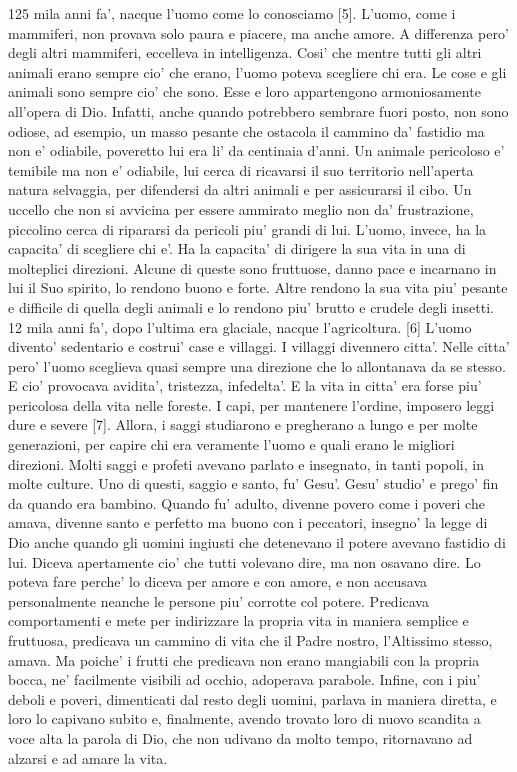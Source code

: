 125 mila anni fa', nacque l'uomo come lo conosciamo [5]. L'uomo, come i mammiferi, non provava solo paura e piacere, ma anche amore. A differenza pero' degli altri mammiferi, eccelleva in intelligenza. Cosi' che mentre tutti gli altri animali erano sempre cio' che erano, l'uomo poteva scegliere chi era. Le cose e gli animali sono sempre cio' che sono. Esse e loro appartengono armoniosamente  all'opera di Dio. Infatti, anche quando potrebbero sembrare fuori posto, non sono odiose, ad esempio, un masso pesante che ostacola il cammino da' fastidio ma non e' odiabile, poveretto lui era li' da centinaia d'anni. Un animale pericoloso e' temibile ma non e' odiabile, lui cerca di ricavarsi il suo territorio nell'aperta natura selvaggia, per difendersi da altri animali e per assicurarsi il cibo. Un uccello che non si avvicina per essere ammirato meglio non da' frustrazione, piccolino cerca di ripararsi da pericoli piu' grandi di lui.
  L'uomo, invece, ha la capacita' di scegliere chi e'. Ha la capacita' di dirigere la sua vita in una di molteplici direzioni. Alcune di queste sono fruttuose, danno pace e incarnano in lui il Suo spirito, lo rendono buono e forte. Altre rendono la sua vita piu' pesante e difficile di quella degli animali e lo rendono piu' brutto e crudele degli insetti.
  12 mila anni fa', dopo l'ultima era glaciale, nacque l'agricoltura. [6] L'uomo divento' sedentario e costrui' case e villaggi. I villaggi divennero citta'. Nelle citta' pero' l'uomo sceglieva quasi sempre una direzione che lo allontanava da se stesso. E cio' provocava avidita', tristezza, infedelta'. E la vita in citta' era forse piu' pericolosa della vita nelle foreste.
  I capi, per mantenere l'ordine, imposero leggi dure e severe [7]. Allora, i saggi studiarono e pregherano a lungo e per molte generazioni, per capire chi era veramente l'uomo e quali erano le migliori direzioni. 
  Molti saggi e profeti avevano parlato e insegnato, in tanti popoli, in molte culture. Uno di questi, saggio e santo, fu' Gesu'. Gesu' studio' e prego' fin da quando era bambino. Quando fu' adulto, divenne povero come i poveri che amava, divenne santo e perfetto ma buono con i peccatori, insegno' la legge di Dio anche quando gli uomini ingiusti che detenevano il potere avevano fastidio di lui. Diceva apertamente cio' che tutti volevano dire, ma non osavano dire. Lo poteva fare perche' lo diceva per amore e con amore, e non accusava personalmente neanche le persone piu' corrotte col potere. Predicava comportamenti e mete per indirizzare la propria vita in maniera semplice e fruttuosa, predicava un cammino di vita che il Padre nostro, l'Altissimo stesso, amava. Ma poiche' i frutti che predicava non erano mangiabili con la propria bocca, ne' facilmente visibili ad occhio, adoperava parabole. Infine, con i piu' deboli e poveri, dimenticati dal resto degli uomini, parlava in maniera diretta, e loro lo capivano subito e, finalmente, avendo trovato loro di nuovo scandita a voce alta la parola di Dio, che non udivano da molto tempo, ritornavano ad alzarsi e ad amare la vita.
